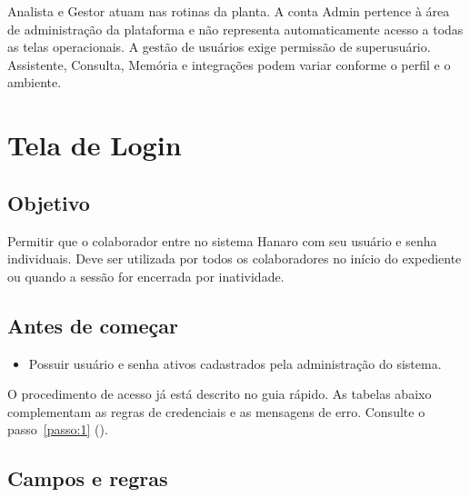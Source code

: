 \begin{remark}[info]
Analista e Gestor atuam nas rotinas da planta. A conta Admin pertence à área de
administração da plataforma e não representa automaticamente acesso a todas as telas
operacionais. A gestão de usuários exige permissão de superusuário. Assistente,
Consulta, Memória e integrações podem variar conforme o perfil e o ambiente.
\end{remark}

\clearpage
\section{Tela de Login}

\subsection*{Objetivo}

Permitir que o colaborador entre no sistema Hanaro com seu usuário e senha individuais. Deve ser utilizada por todos os colaboradores no início do expediente ou quando a sessão for encerrada por inatividade.\par

\subsection*{Antes de começar}

\begin{itemize}
\item Possuir usuário e senha ativos cadastrados pela administração do sistema.
\end{itemize}

\begin{remark}[info]
O procedimento de acesso já está descrito no guia rápido. As tabelas abaixo complementam as regras de credenciais e as mensagens de erro. Consulte o passo~\ref{passo:1} ().
\end{remark}

\Needspace{160pt}

\subsection*{Campos e regras}

